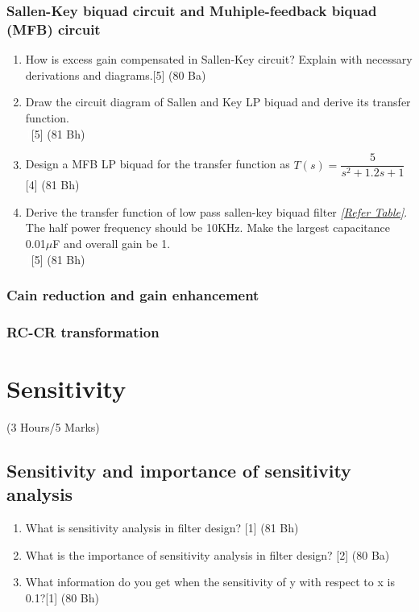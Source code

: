 \documentclass[12pt]{article}
\newcommand{\enter}{\\\textcolor{white}{1}}
\begin{document}
\subsubsection{Sallen-Key biquad circuit and Muhiple-feedback biquad (MFB) circuit}
\begin{enumerate}
\item How is excess gain compensated in Sallen-Key circuit? Explain with necessary derivations and diagrams.\hfill[5] (80 Ba)
\item Draw the circuit diagram of Sallen and Key LP biquad and derive its transfer function.
\enter\hfill [5] (81 Bh)
\item Design a MFB LP biquad for the transfer function as $T(s) = \dfrac{5}{s^2+1.2s+1}$ \hfill [4] (81 Bh)
\item Derive the transfer function of low pass sallen-key biquad filter \textit{[\hyperref[sec:tables_81ba]{Refer Table]}}. The half power frequency should be 10KHz. Make the largest capacitance 0.01$\mu$F and overall gain be 1.
\enter \hfill [5] (81 Bh)
\end{enumerate}
\subsubsection{Cain reduction and gain enhancement}
\subsubsection{RC-CR transformation}

\pagebreak
\section{Sensitivity}
\begin{center}(3 Hours/5 Marks)\end{center}
\subsection{Sensitivity and importance of sensitivity analysis}
\begin{enumerate}
\item What is sensitivity analysis in filter design? \hfill [1] (81 Bh)
\item What is the importance of sensitivity analysis in filter design? \hfill[2] (80 Ba)
\item What information do you get when the sensitivity of y with respect to x is 0.1?\hfill [1] (80 Bh)
\end{enumerate}
\end{document}
